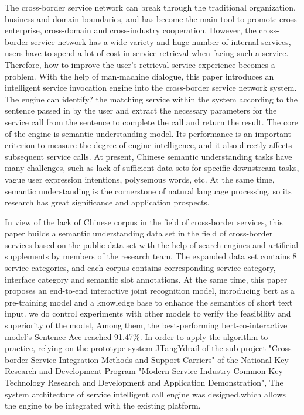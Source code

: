 \begin{englishabstract}
The cross-border service network can break through the traditional organization, business and domain boundaries, 
and has become the main tool to promote cross-enterprise, cross-domain and cross-industry cooperation. 
However, the cross-border service network has a wide variety and huge number of internal services,
users have to spend a lot of cost in service retrieval when facing such a service. 
Therefore, how to improve the user's retrieval service experience becomes a problem. With the help of man-machine dialogue, 
this paper introduces an intelligent service invocation engine into the cross-border service network system. 
The engine can identify? the matching service within the system according to the sentence passed in by the user
and extract the necessary parameters for the service call from the sentence to complete the call and return the result. 
The core of the engine is semantic understanding model. Its performance is an important criterion to measure the degree of engine intelligence, 
and it also directly affects subsequent service calls. At present, Chinese semantic understanding tasks have many challenges, 
such as lack of sufficient data sets for specific downstream tasks, vague user expression intentions, polysemous words, etc. 
At the same time, semantic understanding is the cornerstone of natural language processing, so its research has great significance and application prospects. 

In view of the lack of Chinese corpus in the field of cross-border services, 
this paper builds a semantic understanding data set in the field of cross-border services based on the public data set with the help of search engines and artificial supplements by members of the research team. 
The expanded data set contains 8 service categories, and each corpus contains corresponding service category, 
interface category and semantic slot annotations. At the same time, 
this paper proposes an end-to-end interactive joint recognition model, 
introducing bert as a pre-training model and a knowledge base to enhance the semantics of short text input.
we do control experiments with other models to verify the feasibility and superiority of the model,
Among them, the best-performing bert-co-interactive model's Sentence Acc reached 91.47\%. 
In order to apply the algorithm to practice, 
relying on the prototype system JTangYdrail of the sub-project "Cross-border Service Integration Methods and Support Carriers" of the National Key Research and Development Program "Modern Service Industry Common Key Technology Research and Development and Application Demonstration", 
The system architecture of service intelligent call engine was designed,which allows the engine to be integrated with the existing platform.

\end{englishabstract}
